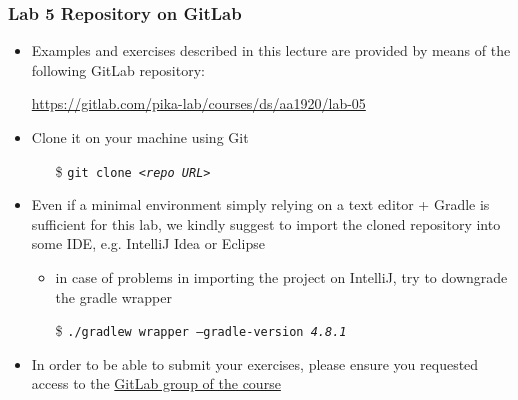 \documentclass[presentation]{beamer}\mode<presentation>{\usetheme{AMSCesenaPurpleAndGold}}
\begin{document}
\begin{frame}
\frametitle{Lab 5 Repository on GitLab}

	\begin{itemize}
		\item Examples and exercises described in this lecture are provided by means of the following GitLab repository:
		\begin{center}
			\url{https://gitlab.com/pika-lab/courses/ds/aa1920/lab-05}
		\end{center}
		
		\vfill
		
		\item Clone it on your machine using Git
		\begin{itemize}
		    \item[\$] \texttt{git clone \textit{<repo URL>}}
		\end{itemize}
		
		\vfill
		
		\item Even if a minimal environment simply relying on a text editor + Gradle is sufficient for this lab, we kindly suggest to import the cloned repository into some IDE, e.g. IntelliJ Idea or Eclipse
		\begin{itemize}
		    \item in case of problems in importing the project on IntelliJ, try to downgrade the gradle wrapper
		    \item[\$] \texttt{./gradlew wrapper \alert{--gradle-version \textit{4.8.1}}}
		\end{itemize}
		
		\vfill
		
		\item In order to be able to submit your exercises, please ensure you requested access to the \href{https://gitlab.com/pika-lab/courses/ds/aa1920}{GitLab group of the course}
	\end{itemize}

\end{frame}

\section*{}
\end{document}
